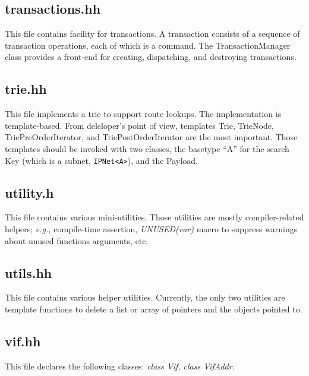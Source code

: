 \documentclass[11pt]{article}
\newcommand{\eg}{\emph{e.g.,}\xspace}
\begin{document}
\subsection{transactions.hh}

This file contains facility for transactions.  A transaction consists
of a sequence of transaction operations, each of which is a command.
The TransactionManager class provides a front-end for creating,
dispatching, and destroying transactions.

\subsection{trie.hh}

This file implements a trie to support route lookups.
The implementation is template-based. From deleloper's point
of view, templates Trie, TrieNode, TriePreOrderIterator,
and TriePostOrderIterator
are the most important. Those templates should be invoked with two
classes, the basetype ``A'' for the search Key (which is a subnet,
\verb=IPNet<A>=), and the Payload.

\subsection{utility.h}

This file contains various mini-utilities.  Those utilities are mostly
compiler-related helpers; \eg compile-time assertion, \emph{UNUSED(var)}
macro to suppress warnings about unused functions arguments, etc.

\subsection{utils.hh}

This file contains various helper utilities. Currently, the only two
utilities are template functions to delete a list or array
of pointers and the objects pointed to.

\subsection{vif.hh}

This file declares the following classes: \emph{class Vif, class
VifAddr}.
\end{document}
